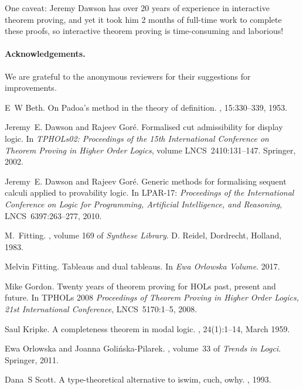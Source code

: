 \documentclass[a4paper]{article}
\begin{document}
One caveat: Jeremy Dawson has over 20 years
of experience in interactive theorem proving, and yet it took him 2
months of full-time work to complete these proofs, so interactive
theorem proving is time-consuming and laborious! 

\paragraph{Acknowledgements.} We are grateful to the anonymous
reviewers for their suggestions for improvements.

% 
 

\begin{thebibliography}{OGP11}

E~W Beth.
\newblock On {Padoa's} method in the theory of definition.
, 15:330--339, 1953.

Jeremy~E. Dawson and Rajeev Gor{\'e}.
\newblock Formalised cut admissibility for display logic.
\newblock In {\em TPHOLs02:
  Proceedings of the 15th International Conference on Theorem Proving in Higher
  Order Logics}, volume LNCS~2410:131--147. Springer, 2002.

 Jeremy~E. Dawson and Rajeev
  Gor{\'{e}}.  \newblock Generic methods for formalising sequent
  calculi applied to provability logic.  \newblock In LPAR-17: {\em
    Proceedings of the International Conference on Logic for
    Programming, Artificial Intelligence, and Reasoning},
  LNCS~6397:263--277, 2010.

M.~Fitting.
, volume 169
  of {\em Synthese Library}.
\newblock D. Reidel, Dordrecht, Holland, 1983.

Melvin Fitting.
\newblock Tableaus and dual tableaus.
\newblock In {\em Ewa Orlowska Volume}. 2017.

 Mike Gordon.  
\newblock Twenty years of theorem proving for {HOL}s past, present and future.
\newblock In TPHOLs 2008 {\em Proceedings of Theorem Proving in
    Higher Order Logics, 21st International Conference}, LNCS~5170:1--5, 2008.

Saul Kripke.
\newblock A completeness theorem in modal logic.
, 24(1):1--14, March 1959.

Ewa Orlowska and Joanna Goli{\'n}ska-Pilarek.
,
  volume~33 of {\em Trends in Logci}.
\newblock Springer, 2011.

Dana~S Scott.
\newblock A type-theoretical alternative to iswim, cuch, owhy.
, 1993.

\end{thebibliography}
\end{document}
